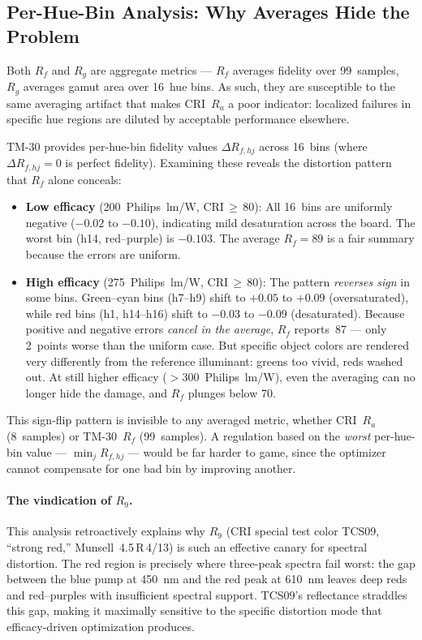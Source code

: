\documentclass[11pt]{article}
\begin{document}
\subsection{Per-Hue-Bin Analysis: Why Averages Hide the Problem}

Both $R_f$ and $R_g$ are aggregate metrics --- $R_f$ averages fidelity
over 99~samples, $R_g$ averages gamut area over 16~hue bins.  As such,
they are susceptible to the same averaging artifact that makes CRI~$R_a$
a poor indicator: localized failures in specific hue regions are diluted
by acceptable performance elsewhere.

TM-30 provides per-hue-bin fidelity values $\Delta R_{f,hj}$ across
16~bins (where $\Delta R_{f,hj} = 0$ is perfect fidelity).  Examining
these reveals the distortion pattern that $R_f$ alone conceals:

\begin{itemize}
\item \textbf{Low efficacy} (200~Philips~lm/W, CRI$\,\geq\,$80):
  All 16~bins are uniformly negative ($-0.02$ to $-0.10$), indicating
  mild desaturation across the board.  The worst bin (h14, red--purple)
  is $-0.103$.  The average $R_f = 89$ is a fair summary because the
  errors are uniform.

\item \textbf{High efficacy} (275~Philips~lm/W, CRI$\,\geq\,$80):
  The pattern \emph{reverses sign} in some bins.  Green--cyan bins
  (h7--h9) shift to $+0.05$ to $+0.09$ (oversaturated), while red
  bins (h1, h14--h16) shift to $-0.03$ to $-0.09$ (desaturated).
  Because positive and negative errors \emph{cancel in the average},
  $R_f$ reports~87 --- only 2~points worse than the uniform case.
  But specific object colors are rendered very differently from the
  reference illuminant: greens too vivid, reds washed out.  At still
  higher efficacy ($>$300~Philips~lm/W), even the averaging can no
  longer hide the damage, and $R_f$ plunges below 70.
\end{itemize}

This sign-flip pattern is invisible to any averaged metric, whether
CRI~$R_a$ (8~samples) or TM-30~$R_f$ (99~samples).  A regulation
based on the \emph{worst} per-hue-bin value --- $\min_j R_{f,hj}$ ---
would be far harder to game, since the optimizer cannot compensate for
one bad bin by improving another.

\paragraph{The vindication of $R_9$.}
This analysis retroactively explains why $R_9$ (CRI special test color
TCS09, ``strong red,'' Munsell~4.5\,R\,4/13) is such an effective
canary for spectral distortion.  The red region is precisely where
three-peak spectra fail worst: the gap between the blue pump at 450~nm
and the red peak at 610~nm leaves deep reds and red--purples with
insufficient spectral support.  TCS09's reflectance straddles this
gap, making it maximally sensitive to the specific distortion mode
that efficacy-driven optimization produces.
\end{document}
